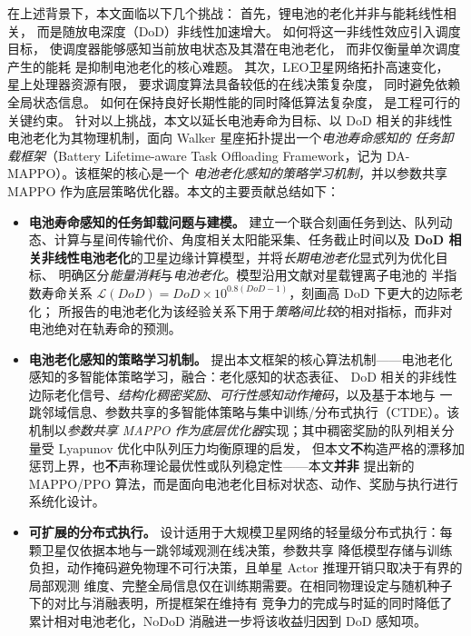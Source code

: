 \documentclass[a4paper,11pt]{article}
\begin{document}
在上述背景下，本文面临以下几个挑战：
首先，锂电池的老化并非与能耗线性相关，
而是随放电深度（DoD）非线性加速增大。
如何将这一非线性效应引入调度目标，
使调度器能够感知当前放电状态及其潜在电池老化，
而非仅衡量单次调度产生的能耗
是抑制电池老化的核心难题。
其次，LEO卫星网络拓扑高速变化，
星上处理器资源有限，
要求调度算法具备较低的在线决策复杂度，
同时避免依赖全局状态信息。
如何在保持良好长期性能的同时降低算法复杂度，
是工程可行的关键约束。
针对以上挑战，本文以延长电池寿命为目标、以 DoD 相关的非线性电池老化为其物理机制，面向 Walker 星座拓扑提出一个\emph{电池寿命感知的
任务卸载框架}（Battery Lifetime-aware Task Offloading Framework，记为 DA-MAPPO）。该框架的核心是一个
\emph{电池老化感知的策略学习机制}，并以参数共享 MAPPO 作为底层策略优化器。本文的主要贡献总结如下：
\begin{itemize}
    \item \textbf{电池寿命感知的任务卸载问题与建模。}
    建立一个联合刻画任务到达、队列动态、计算与星间传输代价、角度相关太阳能采集、任务截止时间以及
    \textbf{DoD 相关非线性电池老化}的卫星边缘计算模型，并将\emph{长期电池老化}显式列为优化目标、
    明确区分\emph{能量消耗}与\emph{电池老化}。模型沿用文献\cite{chen2025tasri}对星载锂离子电池的
    半指数寿命关系 $\mathcal{L}(DoD)=DoD\times10^{0.8(DoD-1)}$，刻画高 DoD 下更大的边际老化；
    所报告的电池老化为该经验关系下用于\emph{策略间比较}的相对指标，而非对电池绝对在轨寿命的预测。

    \item \textbf{电池老化感知的策略学习机制。}
    提出本文框架的核心算法机制——电池老化感知的多智能体策略学习，融合：老化感知的状态表征、
    DoD 相关的非线性边际老化信号、\emph{结构化稠密奖励}、\emph{可行性感知动作掩码}，以及基于本地与
    一跳邻域信息、参数共享的多智能体策略与集中训练/分布式执行（CTDE）。该机制以\emph{参数共享
    MAPPO 作为底层优化器}实现；其中稠密奖励的队列相关分量受 Lyapunov 优化中队列压力均衡原理的启发，
    但本文\textbf{不}构造严格的漂移加惩罚上界，也\textbf{不}声称理论最优性或队列稳定性——本文\textbf{并非}
    提出新的 MAPPO/PPO 算法，而是面向电池老化目标对状态、动作、奖励与执行进行系统化设计。

    \item \textbf{可扩展的分布式执行。}
    设计适用于大规模卫星网络的轻量级分布式执行：每颗卫星仅依据本地与一跳邻域观测在线决策，参数共享
    降低模型存储与训练负担，动作掩码避免物理不可行决策，且单星 Actor 推理开销只取决于有界的局部观测
    维度、完整全局信息仅在训练期需要。在相同物理设定与随机种子下的对比与消融表明，所提框架在维持有
    竞争力的完成与时延的同时降低了累计相对电池老化，NoDoD 消融进一步将该收益归因到 DoD 感知项。
\end{itemize}
\end{document}

